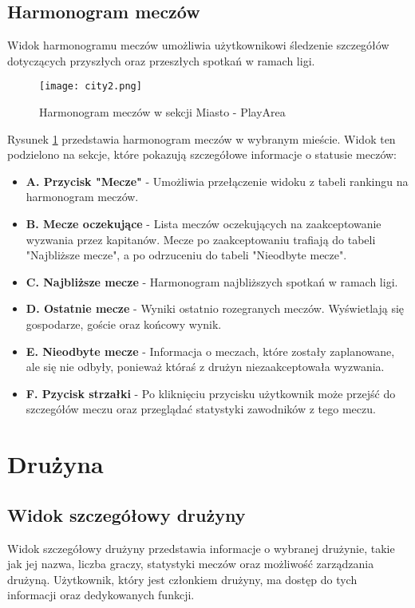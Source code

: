 \documentclass[wmii,inf,inz]{uwmthesis} %
\begin{document}
\subsection{Harmonogram meczów}
Widok harmonogramu meczów umożliwia użytkownikowi śledzenie szczegółów dotyczących przyszłych oraz przeszłych spotkań w ramach ligi.

\begin{figure}[H]
    \centering
    \texttt{[image: city2.png]}
    \caption{Harmonogram meczów w sekcji Miasto - PlayArea}
    \label{fig:city_matches}
\end{figure}

\noindent
Rysunek \ref{fig:city_matches} przedstawia harmonogram meczów w wybranym mieście. Widok ten podzielono na sekcje, które pokazują szczegółowe informacje o statusie meczów:
\begin{itemize}
    \item \textbf{A. Przycisk "Mecze"} - Umożliwia przełączenie widoku z tabeli rankingu na harmonogram meczów.
    \item \textbf{B. Mecze oczekujące} - Lista meczów oczekujących na zaakceptowanie wyzwania przez kapitanów. Mecze po zaakceptowaniu trafiają do tabeli "Najbliższe mecze", a po odrzuceniu do tabeli "Nieodbyte mecze".
    \item \textbf{C. Najbliższe mecze} - Harmonogram najbliższych spotkań w ramach ligi.
    \item \textbf{D. Ostatnie mecze} - Wyniki ostatnio rozegranych meczów. Wyświetlają się gospodarze, goście oraz końcowy wynik.
    \item \textbf{E. Nieodbyte mecze} - Informacja o meczach, które zostały zaplanowane, ale się nie odbyły, ponieważ któraś z drużyn niezaakceptowała wyzwania.
    \item \textbf{F. Pzycisk strzałki} - Po kliknięciu przycisku użytkownik może przejść do szczegółów meczu oraz przeglądać statystyki zawodników z tego meczu.
\end{itemize}
\section{Drużyna}

\subsection{Widok szczegółowy drużyny}
Widok szczegółowy drużyny przedstawia informacje o wybranej drużynie, takie jak jej nazwa, liczba graczy, statystyki meczów oraz możliwość zarządzania drużyną. Użytkownik, który jest członkiem drużyny, ma dostęp do tych informacji oraz dedykowanych funkcji.
\end{document}
